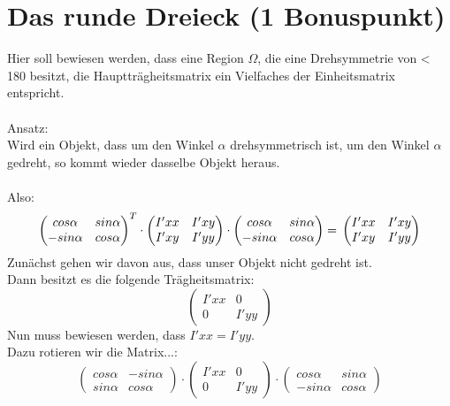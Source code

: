 \documentclass{ezb}
\begin{document}
\newpage
\section{Das runde Dreieck (1 Bonuspunkt)}
Hier soll bewiesen werden, dass eine Region $\Omega$, die eine Drehsymmetrie von < 180 \degree besitzt, die Hauptträgheitsmatrix ein Vielfaches der Einheitsmatrix entspricht.\\
\\
Ansatz: \\
Wird ein Objekt, dass um den Winkel $\alpha$ drehsymmetrisch ist, um den Winkel $\alpha$ gedreht, so kommt wieder dasselbe Objekt heraus.\\
\\
Also:\\
\begin{equation}
\begin{pmatrix}
cos \alpha & sin \alpha \\
-sin \alpha & cos \alpha 
\end{pmatrix}^{T}
\cdot
\begin{pmatrix}
I'xx & I'xy \\
I'xy & I'yy 
\end{pmatrix}
\cdot
\begin{pmatrix}
cos \alpha & sin \alpha \\
-sin \alpha & cos \alpha 
\end{pmatrix}
= \\
\begin{pmatrix}
I'xx & I'xy \\
I'xy & I'yy 
\end{pmatrix}
\label{urformel}
\end{equation}
\linebreak
Zunächst gehen wir davon aus, dass unser Objekt nicht gedreht ist.\\
Dann besitzt es die folgende Trägheitsmatrix:\\
\begin{equation}
\begin{pmatrix}
I'xx & 0 \\
0 & I'yy
\end{pmatrix}
\end{equation}
\linebreak
Nun muss bewiesen werden, dass $I'xx = I'yy$.\\
Dazu rotieren wir die Matrix...:\\
\begin{equation}
\begin{pmatrix}
cos \alpha & -sin \alpha \\
sin \alpha & cos \alpha 
\end{pmatrix}
\cdot
\begin{pmatrix}
I'xx & 0 \\
0 & I'yy 
\end{pmatrix}
\cdot
\begin{pmatrix}
cos \alpha & sin \alpha \\
-sin \alpha & cos \alpha 
\end{pmatrix}
\label{drehformel}
\end{equation}
\end{document}
